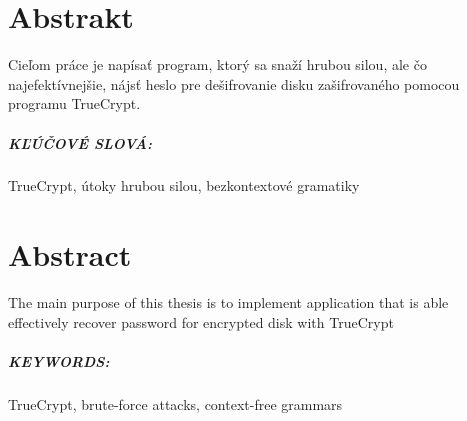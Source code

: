 \chapter*{Abstrakt}
Cieľom práce je napísať program, ktorý sa snaží hrubou silou, ale čo najefektívnejšie, nájsť heslo pre dešifrovanie disku zašifrovaného pomocou programu TrueCrypt.

\paragraph{KĽÚČOVÉ SLOVÁ:}
TrueCrypt, útoky hrubou silou, bezkontextové gramatiky

\newpage
\chapter*{Abstract}
The main purpose of this thesis is to implement application that is able effectively recover password for encrypted disk with TrueCrypt

\paragraph{KEYWORDS:}
TrueCrypt, brute-force attacks, context-free grammars
